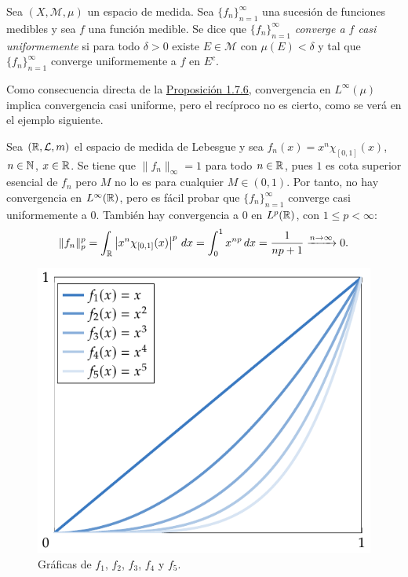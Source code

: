 \documentclass[a4paper, 11pt, oneside]{report}
\begin{document}
\begin{definition}
  Sea $(X,\mathcal{M},\mu)$ un espacio de medida. Sea $\{f_n\}_{n=1}^\infty$ una sucesión de funciones medibles y sea $f$ una función medible. Se dice que $\{f_n\}_{n=1}^\infty$ \emph{converge a $f$ casi uniformemente} si para todo $\delta > 0$ existe $E \in \mathcal{M}$ con $\mu(E) < \delta$ y tal que $\{f_n\}_{n=1}^\infty$ converge uniformemente a $f$ en $E^c$.
\end{definition}

Como consecuencia directa de la \hyperref[pro:1.8.6]{\color{c1}Proposición 1.7.6}, convergencia en $L^\infty(\mu)$ implica convergencia casi uniforme, pero el recíproco no es cierto, como se verá en el ejemplo siguiente.

\begin{example}
  Sea $(\mathbb R,\mathcal{L},m)$ el espacio de medida de Lebesgue y sea $f_n(x) = x^n \chi_{[0,1]}(x)$, $n \in \mathbb N$, $x \in \mathbb R$. Se tiene que $\|f_n\|_\infty= 1$ para todo $n \in \mathbb R$, pues $1$ es cota superior esencial de $f_n$ pero $M$ no lo es para cualquier $M \in (0,1)$. Por tanto, no hay convergencia en $L^\infty(\mathbb R)$, pero es fácil probar que $\{f_n\}_{n=1}^\infty$ converge casi uniformemente a $0$. También hay convergencia a $0$ en $L^p(\mathbb R)$, con $1 \leq p < \infty$:
  \[\|f_n\|_p^p = \int_\mathbb R \left|x^n \chi_{[0,1]}(x)\right|^p \, dx = \int_0^1 x^{np} \, dx = \frac{1}{np+1} \xrightarrow{n \to \infty} 0.\]

  \begin{figure}[H]
    \centering
    \includegraphics{./plot8/main.pdf}
    \caption{Gráficas de $f_1$, $f_2$, $f_3$, $f_4$ y $f_5$.}
  \end{figure}

\end{example}
\end{document}
